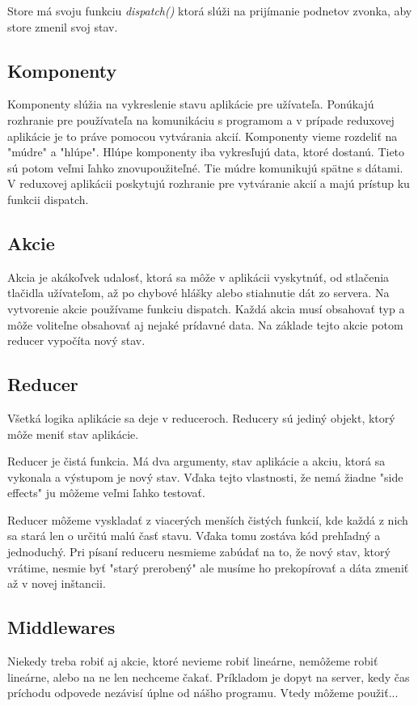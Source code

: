 Store má svoju funkciu \emph{dispatch()} ktorá slúži na prijímanie podnetov zvonka, aby store zmenil svoj stav.

\subsection{Komponenty}%
Komponenty slúžia na vykreslenie stavu aplikácie pre užívateľa. Ponúkajú rozhranie pre používateľa na komunikáciu s programom a v prípade reduxovej aplikácie je to práve pomocou vytvárania akcií. Komponenty vieme rozdeliť na "múdre" a "hlúpe".%
Hlúpe komponenty iba vykresľujú data, ktoré dostanú. Tieto sú potom veľmi ľahko znovupoužiteľné. Tie múdre komunikujú spätne s dátami. V reduxovej aplikácii poskytujú rozhranie pre vytváranie akcií a majú prístup ku funkcii dispatch.

\subsection{Akcie}
Akcia je akákoľvek udalosť, ktorá sa môže v aplikácii vyskytnúť, od stlačenia tlačidla užívateľom, až po chybové hlášky alebo stiahnutie dát zo servera. Na vytvorenie akcie používame funkciu dispatch. Každá akcia musí obsahovať typ a môže voliteľne obsahovať aj nejaké prídavné data. Na základe tejto akcie potom reducer vypočíta nový stav.

\subsection{Reducer}%
Všetká logika aplikácie sa deje v reduceroch. Reducery sú jediný objekt, ktorý môže meniť stav aplikácie.

Reducer je čistá funkcia. Má dva argumenty, stav aplikácie a akciu, ktorá sa vykonala a výstupom je nový stav. Vďaka tejto vlastnosti, že nemá žiadne "side effects" ju môžeme veľmi ľahko testovať.

Reducer môžeme vyskladať z viacerých menších čistých funkcií, kde každá z nich sa stará len o určitú malú časť stavu. Vďaka tomu zostáva kód prehľadný a jednoduchý.%
Pri písaní reduceru nesmieme zabúdať na to, že nový stav, ktorý vrátime, nesmie byť "starý prerobený" ale musíme ho prekopírovať a dáta zmeniť až v novej inštancii.

\subsection{Middlewares}
Niekedy treba robiť aj akcie, ktoré nevieme robiť lineárne, nemôžeme robiť lineárne, alebo na ne len nechceme čakať. Príkladom je dopyt na server, kedy čas príchodu odpovede nezávisí úplne od nášho programu. Vtedy môžeme použiť...%







